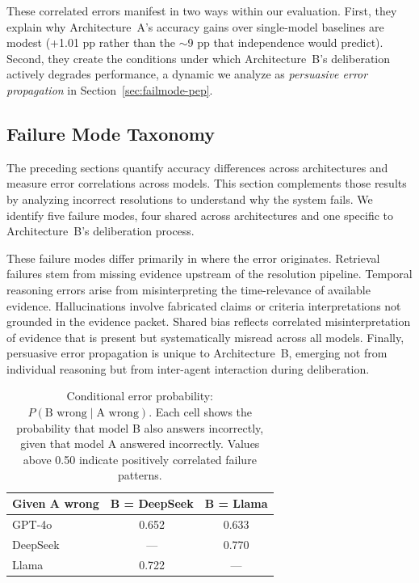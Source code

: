 These correlated errors manifest in two ways within our evaluation. First, they explain why Architecture~A's accuracy gains over single-model baselines are modest (+1.01 pp rather than the $\sim$9 pp that independence would predict). Second, they create the conditions under which Architecture~B's deliberation actively degrades performance, a dynamic we analyze as \emph{persuasive error propagation} in Section~\ref{sec:failmode-pep}.


\subsection{Failure Mode Taxonomy}
\label{sec:failure}


The preceding sections quantify accuracy differences across architectures and measure error correlations across models. This section complements those results by analyzing incorrect resolutions to understand why the system fails. We identify five failure modes, four shared across architectures and one specific to Architecture~B's deliberation process.

These failure modes differ primarily in where the error originates. Retrieval failures stem from missing evidence upstream of the resolution pipeline. Temporal reasoning errors arise from misinterpreting the time-relevance of available evidence. Hallucinations involve fabricated claims or criteria interpretations not grounded in the evidence packet. Shared bias reflects correlated misinterpretation of evidence that is present but systematically misread across all models. Finally, persuasive error propagation is unique to Architecture~B, emerging not from individual reasoning but from inter-agent interaction during deliberation.
\begin{table}[t]
\centering
\caption{Conditional error probability: $P(\text{B wrong} \mid \text{A wrong})$. Each cell shows the probability that model B also answers incorrectly, given that model A answered incorrectly. Values above 0.50 indicate positively correlated failure patterns.}
\label{tab:pairwise}
\begin{tabular}{lcc}
\toprule
\textbf{Given A wrong} & \textbf{B = DeepSeek} & \textbf{B = Llama} \\
\midrule
GPT-4o   & 0.652 & 0.633 \\
DeepSeek & ---   & 0.770 \\
Llama    & 0.722 & --- \\
\bottomrule
\end{tabular}
\end{table}

